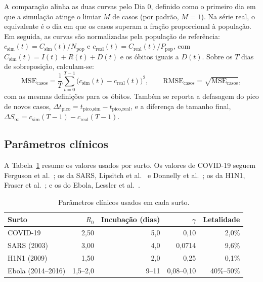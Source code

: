 \documentclass[11pt]{article}
\begin{document}
A comparação alinha as duas curvas pelo Dia 0, definido como o primeiro dia em que a simulação atinge o limiar $M$ de casos (por padrão, $M = 1$). Na série real, o equivalente é o dia em que os casos superam a fração proporcional à população. Em seguida, as curvas são normalizadas pela população de referência: $c_{\text{sim}}(t) = C_{\text{sim}}(t)/N_{\text{pop}}$ e $c_{\text{real}}(t) = C_{\text{real}}(t)/P_{\text{pop}}$, com $C_{\text{sim}}(t) = I(t) + R(t) + D(t)$ e os óbitos iguais a $D(t)$. Sobre os $T$ dias de sobreposição, calculam-se:
\begin{equation}
\mathrm{MSE}_{\text{casos}} = \frac{1}{T}\sum_{t=0}^{T-1}\bigl(c_{\text{sim}}(t) - c_{\text{real}}(t)\bigr)^2, \qquad \mathrm{RMSE}_{\text{casos}} = \sqrt{\mathrm{MSE}_{\text{casos}}},
\end{equation}
com as mesmas definições para os óbitos. Também se reporta a defasagem do pico de novos casos, $\Delta t_{\text{pico}} = t_{\text{pico,sim}} - t_{\text{pico,real}}$, e a diferença de tamanho final, $\Delta S_{\infty} = c_{\text{sim}}(T-1) - c_{\text{real}}(T-1)$.

\subsection{Parâmetros clínicos}

A Tabela~\ref{tab:parametros} resume os valores usados por surto. Os valores de COVID-19 seguem Ferguson et al.~\cite{ferguson2005}; os da SARS, Lipsitch et al.~\cite{lipsitch2003} e Donnelly et al.~\cite{donnelly2003}; os da H1N1, Fraser et al.~\cite{fraser2009}; e os do Ebola, Lessler et al.~\cite{lessler2009}.

\begin{table}[!ht]
\centering
\caption{Parâmetros clínicos usados em cada surto.}
\label{tab:parametros}
\footnotesize
\begin{tabular}{lrrrr}
\hline
\textbf{Surto} & \textbf{$R_0$} & \textbf{Incubação (dias)} & \textbf{$\gamma$} & \textbf{Letalidade} \\
\hline
COVID-19 & 2,50 & 5,0 & 0,10 & 2,0\% \\
SARS (2003) & 3,00 & 4,0 & 0,0714 & 9,6\% \\
H1N1 (2009) & 1,50 & 2,0 & 0,25 & 0,1\% \\
Ebola (2014--2016) & 1,5--2,0 & 9--11 & 0,08--0,10 & 40\%--50\% \\
\hline
\end{tabular}
\end{table}
\end{document}

